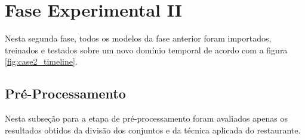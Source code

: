    \section{Fase Experimental II}
        
        \begin{figure}[H]
        \end{figure}
	    Nesta segunda fase, todos os modelos da fase anterior foram importados, treinados e testados sobre um novo domínio temporal de acordo com a figura \ref{fig:case2_timeline}.
        
	    \subsection{Pré-Processamento}
	        Nesta subseção para a etapa de pré-processamento foram avaliados apenas os resultados obtidos da divisão dos conjuntos e da técnica aplicada do restaurante.
	        
